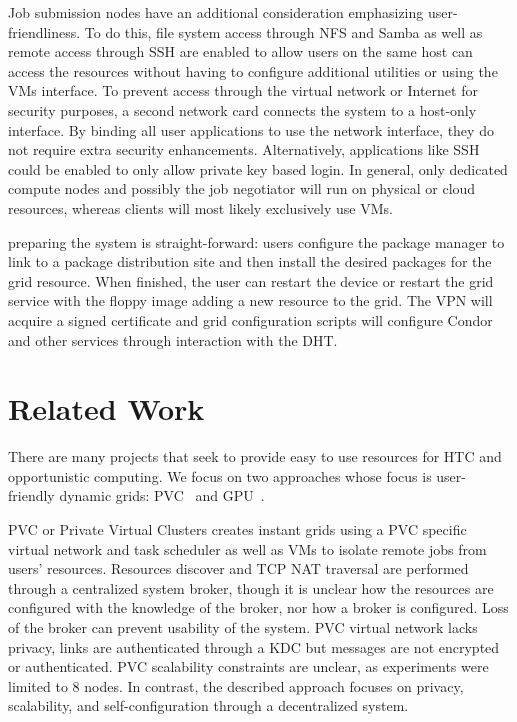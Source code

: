 Job submission nodes have an additional consideration emphasizing
user-friendliness.  To do this, file system access through NFS and Samba
as well as remote access through SSH are enabled to allow users on the same
host can access the resources without having to configure additional utilities
or using the VMs interface.  To prevent access through the virtual network or
Internet for security purposes, a second network card connects the system to
a host-only interface.  By binding all user applications to use the network
interface, they do not require extra security enhancements.  Alternatively,
applications like SSH could be enabled to only allow private key based login.
In general, only dedicated compute nodes and possibly the job negotiator will
run on physical or cloud resources, whereas clients will most likely
exclusively use VMs.

preparing the system is straight-forward: users configure the package manager to
link to a package distribution site and then install the desired packages for
the grid resource.  When finished, the user can restart the device or restart
the grid service with the floppy image adding a new resource to the grid.  The
VPN will acquire a signed certificate and grid configuration scripts will
configure Condor and other services through interaction with the DHT.

\section{Related Work}
\label{related_work}
There are many projects that seek to provide easy to use resources for HTC
and opportunistic computing.  We focus on two approaches whose focus is
user-friendly dynamic grids: PVC~\cite{pvc} and GPU~\cite{gpu}.

PVC or Private Virtual Clusters creates instant grids using a PVC specific
virtual network and task scheduler as well as VMs to isolate remote jobs from
users' resources.  Resources discover and TCP NAT traversal are performed
through a centralized system broker, though it is unclear how the resources are
configured with the knowledge of the broker, nor how a broker is configured.
Loss of the broker can prevent usability of the system.  PVC virtual network
lacks privacy, links are authenticated through a KDC but messages are not
encrypted or authenticated.  PVC scalability constraints are unclear, as
experiments were limited to 8 nodes.  In contrast, the described approach
focuses on privacy, scalability, and self-configuration through a decentralized
system.

